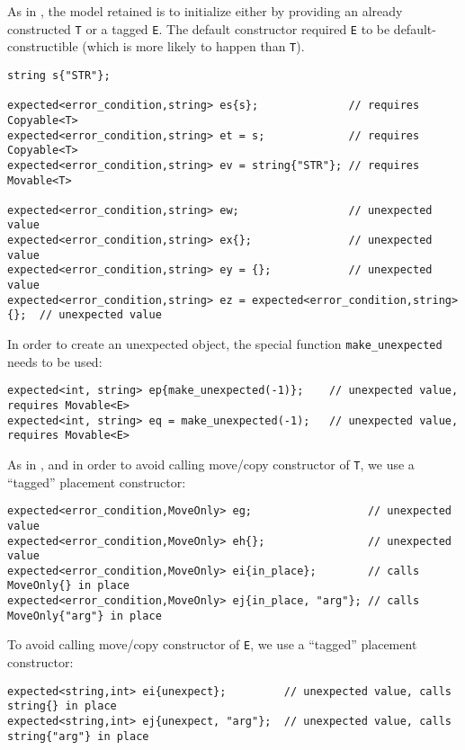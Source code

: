 \documentclass[a4paper,10pt]{article}
\newcommand{\cpp}[1]{\lstinline{#1}}
\begin{document}
\noindent
As in \cite{OptionalRev4}, the model retained is to initialize either by providing an already constructed \cpp{T} or a tagged \cpp{E}. The default constructor required \cpp{E} to be default-constructible (which is more likely to happen than \cpp{T}).

\begin{lstlisting}
string s{"STR"};

expected<error_condition,string> es{s};              // requires Copyable<T>
expected<error_condition,string> et = s;             // requires Copyable<T>
expected<error_condition,string> ev = string{"STR"}; // requires Movable<T>

expected<error_condition,string> ew;                 // unexpected value
expected<error_condition,string> ex{};               // unexpected value
expected<error_condition,string> ey = {};            // unexpected value
expected<error_condition,string> ez = expected<error_condition,string>{};  // unexpected value
\end{lstlisting}

\noindent
In order to create an unexpected object, the special function \cpp{make_unexpected} needs to be used:

\begin{lstlisting}
expected<int, string> ep{make_unexpected(-1)};    // unexpected value, requires Movable<E>
expected<int, string> eq = make_unexpected(-1);   // unexpected value, requires Movable<E>
\end{lstlisting}

\noindent
As in \cite{OptionalRev4}, and in order to avoid calling move/copy constructor of \cpp{T}, we use a ``tagged'' placement constructor: 

\begin{lstlisting}
expected<error_condition,MoveOnly> eg;                  // unexpected value
expected<error_condition,MoveOnly> eh{};                // unexpected value
expected<error_condition,MoveOnly> ei{in_place};        // calls MoveOnly{} in place
expected<error_condition,MoveOnly> ej{in_place, "arg"}; // calls MoveOnly{"arg"} in place
\end{lstlisting}

\noindent
To avoid calling move/copy constructor of \cpp{E}, we use a ``tagged'' placement constructor: 

\begin{lstlisting}
expected<string,int> ei{unexpect};         // unexpected value, calls string{} in place
expected<string,int> ej{unexpect, "arg"};  // unexpected value, calls string{"arg"} in place
\end{lstlisting}
\end{document}

